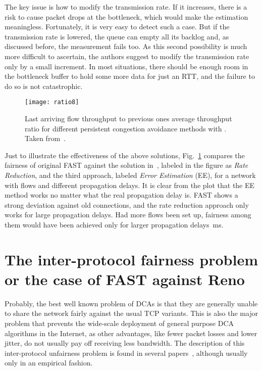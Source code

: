 \documentclass[english,times]{ettauth}
\begin{document}
The key issue is how to modify the transmission rate. If it increases, there
is a risk to cause packet drops at the bottleneck, which would make the
estimation meaningless. Fortunately, it is very easy to detect such a case.
But if the transmission rate is lowered, the queue can empty all its backlog
and, as discussed before, the measurement fails too. As this second
possibility is much more difficult to ascertain, the authors suggest to modify
the transmission rate only by a small increment. In most situations, there
should be enough room in the bottleneck buffer to hold some more data for just
an RTT, and the failure to do so is not catastrophic.

\begin{figure}
  \centering
  \texttt{[image: ratio8]}
  \caption{Last arriving flow throughput to previous ones average throughput
    ratio for different persistent congestion avoidance methods with .
    Taken from~\cite{Rperez08b}.}
  \label{fig:delay-impact}
\end{figure}
Just to illustrate the effectiveness of the above solutions,
Fig.~\ref{fig:delay-impact} compares the fairness of original FAST against the
solution in~\cite{Cui06}, labeled in the figure as \emph{Rate Reduction}, and
the third approach, labeled \emph{Error Estimation} (EE), for a network with
 flows and different propagation delays. It is clear from the plot that
the EE method works no matter what the real propagation delay is. FAST shows a
strong deviation against old connections, and the rate reduction approach only
works for large propagation delays. Had more flows been set up, fairness among
them would have been achieved only for larger propagation delays~ms.

\section{The inter-protocol fairness problem or the case of FAST against Reno}
\label{sec:parameter-tuning}

Probably, the best well known problem of DCAs is that they are generally
unable to share the network fairly against the usual TCP variants. This is
also the major problem that prevents the wide-scale deployment of general
purpose DCA algorithms in the Internet, as other advantages, like fewer packet
losses and lower jitter, do not usually pay off receiving less bandwidth. The
description of this inter-protocol unfairness problem is found in several
papers~\cite{Bonal99,Hengartner00,Mo99,Martin03}, although usually only in an
empirical fashion.
\end{document}
